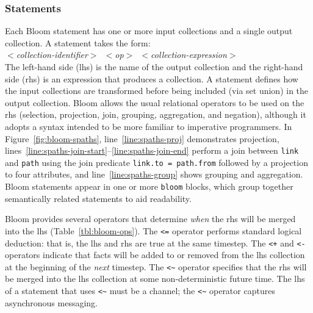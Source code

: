 \subsubsection{Statements}
Each Bloom statement has one or more input collections and a single output
collection.  A statement takes the form: \\ \noindent
\mbox{\hspace{0.25in}\emph{$<$collection-identifier$>$ $<$op$>$
    $<$collection-expression$>$}}\\ \noindent
The left-hand side (lhs) is the name of the output collection and the right-hand
side (rhs) is an expression that produces a collection.  A statement defines how
the input collections are transformed before being included (via set union) in
the output collection. Bloom allows the usual relational operators to be used on
the rhs (selection, projection, join, grouping, aggregation, and negation),
although it adopts a syntax intended to be more familiar to imperative
programmers. In Figure~\ref{fig:bloom-spaths}, line~\ref{line:spaths-proj}
demonstrates projection,
lines~\ref{line:spaths-join-start}--\ref{line:spaths-join-end} perform a join
between \texttt{link} and \texttt{path} using the join predicate
\verb+link.to = path.from+ followed by a projection to four attributes, and
line~\ref{line:spaths-group} shows grouping and aggregation. Bloom statements
appear in one or more \texttt{bloom} blocks, which group together semantically
related statements to aid readability.

Bloom provides several operators that determine \emph{when} the rhs will be
merged into the lhs (Table~\ref{tbl:bloom-ops}). The \verb|<=| operator performs
standard logical deduction: that is, the lhs and rhs are true at the same
timestep. The \verb|<+| and \verb|<-| operators indicate that facts will be
added to or removed from the lhs collection at the beginning of the \emph{next}
timestep. The \verb+<~+ operator specifies that the rhs will be merged into the
lhs collection at some non-deterministic future time. The lhs of a statement
that uses \verb+<~+ must be a channel; the \verb+<~+ operator captures
asynchronous messaging.

